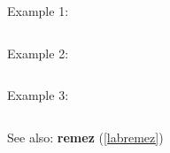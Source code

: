 \noindent Example 1: 
\begin{center}\begin{minipage}{15cm}\begin{Verbatim}[frame=single]
\end{Verbatim}
\end{minipage}\end{center}
\noindent Example 2: 
\begin{center}\begin{minipage}{15cm}\begin{Verbatim}[frame=single]
\end{Verbatim}
\end{minipage}\end{center}
\noindent Example 3: 
\begin{center}\begin{minipage}{15cm}\begin{Verbatim}[frame=single]
\end{Verbatim}
\end{minipage}\end{center}
See also: \textbf{remez} (\ref{labremez})
